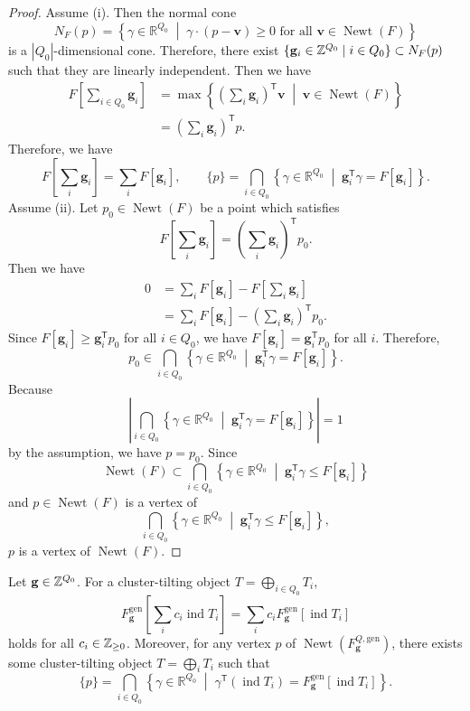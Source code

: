 \begin{proof}
Assume (i).
Then the normal cone
\[
N_F(p)
= \left\{\gamma \in \mathbb{R}^{Q_0}
\;\middle|\;
\gamma\cdot(p-\mathbf{v}) \geq 0
\text{ for all } \mathbf{v} \in \operatorname{Newt}(F)\right\}
\]
is a $|Q_0|$-dimensional cone.
Therefore, there exist
$\{\mathbf{g}_i \in \mathbb{Z}^{Q_0} \mid i \in Q_0\} \subset N_F(p)$
such that they are linearly independent.
Then we have
\[
\begin{aligned}
F\left[\sum_{i \in Q_0}\mathbf{g}_i\right]
&= \max\left\{
\left(\sum_i \mathbf{g}_i\right)^{\mathsf{T}}\mathbf{v}
\;\middle|\; \mathbf{v} \in \operatorname{Newt}(F)\right\} \\
&= \left(\sum_i \mathbf{g}_i\right)^{\mathsf{T}}p.
\end{aligned}
\]
Therefore, we have
\[
F\left[\sum_i \mathbf{g}_i\right] = \sum_i F[\mathbf{g}_i],
\qquad
\{p\} = \bigcap_{i \in Q_0}
\left\{\gamma \in \mathbb{R}^{Q_0}
\;\middle|\; \mathbf{g}_i^{\mathsf{T}}\gamma = F[\mathbf{g}_i]\right\}.
\]
Assume (ii).
Let $p_0 \in \operatorname{Newt}(F)$ be a point which satisfies
\[
F\left[\sum_i \mathbf{g}_i\right]
= \left(\sum_i \mathbf{g}_i\right)^{\mathsf{T}}p_0.
\]
Then we have
\[
\begin{aligned}
0
&= \sum_i F[\mathbf{g}_i] - F\left[\sum_i \mathbf{g}_i\right] \\
&= \sum_i F[\mathbf{g}_i]
- \left(\sum_i \mathbf{g}_i\right)^{\mathsf{T}}p_0.
\end{aligned}
\]
Since $F[\mathbf{g}_i] \geq \mathbf{g}_i^{\mathsf{T}}p_0$ for all $i \in Q_0$,
we have $F[\mathbf{g}_i] = \mathbf{g}_i^{\mathsf{T}}p_0$ for all $i$.
Therefore,
\[
p_0 \in \bigcap_{i \in Q_0}
\left\{\gamma \in \mathbb{R}^{Q_0}
\;\middle|\; \mathbf{g}_i^{\mathsf{T}}\gamma = F[\mathbf{g}_i]\right\}.
\]
Because
\[
\left|
\bigcap_{i \in Q_0}
\left\{\gamma \in \mathbb{R}^{Q_0}
\;\middle|\; \mathbf{g}_i^{\mathsf{T}}\gamma = F[\mathbf{g}_i]\right\}
\right| = 1
\]
by the assumption, we have $p = p_0$.
Since
\[
\operatorname{Newt}(F)
\subset
\bigcap_{i \in Q_0}
\left\{\gamma \in \mathbb{R}^{Q_0}
\;\middle|\; \mathbf{g}_i^{\mathsf{T}}\gamma \leq F[\mathbf{g}_i]\right\}
\]
and $p \in \operatorname{Newt}(F)$ is a vertex of
\[
\bigcap_{i \in Q_0}
\left\{\gamma \in \mathbb{R}^{Q_0}
\;\middle|\; \mathbf{g}_i^{\mathsf{T}}\gamma \leq F[\mathbf{g}_i]\right\},
\]
$p$ is a vertex of $\operatorname{Newt}(F)$.
\end{proof}

\begin{Prop}
\label{Prop : cluster cones and generic Newton polytopes}
Let $\mathbf{g} \in \mathbb{Z}^{Q_0}$.
For a cluster-tilting object $T = \bigoplus_{i \in Q_0}T_i$,
\[
F_{\mathbf{g}}^{\mathrm{gen}}\left[\sum_i c_i\operatorname{ind}T_i\right]
= \sum_i c_i F_{\mathbf{g}}^{\mathrm{gen}}[\operatorname{ind}T_i]
\]
holds for all $c_i \in \mathbb{Z}_{\geq 0}$.
Moreover, for any vertex $p$ of
$\operatorname{Newt}(F_{\mathbf{g}}^{Q,\mathrm{gen}})$,
there exists some cluster-tilting object
$T = \bigoplus_i T_i$ such that
\[
\{p\} = \bigcap_{i \in Q_0}
\left\{\gamma \in \mathbb{R}^{Q_0}
\;\middle|\;
\gamma^{\mathsf{T}}(\operatorname{ind}T_i)
= F_{\mathbf{g}}^{\mathrm{gen}}[\operatorname{ind}T_i]\right\}.
\]
\end{Prop}


